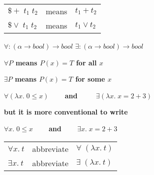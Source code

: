 \vskip7mm


\vskip7mm
\bspindent\LARGE{\bf
\begin{tabular}{@{}l@{\qquad}l@{\qquad}l}
\( \$+ \; t_1 \; t_2 \) & means & \( t_1 + t_2 \) \\
\( \$\vee \; t_1 \; t_2\) & means & \( t_1 \vee t_2 \) \\
\end{tabular}}
\espindent



\vskip 7mm
\bspindent\LARGE 
\( \forall : (\alpha \rightarrow bool) \rightarrow bool \)
\espindent
\vskip 5mm
\bspindent\LARGE 
\( \exists : (\alpha \rightarrow bool) \rightarrow bool \)
\espindent

\vskip5mm


\vskip 7mm
\bspindent\LARGE 
{\bf $\forall P$ means $P(x)=T$ for all $x$}
\espindent

\vskip 7mm
\bspindent\LARGE 
{\bf $\exists P$ means $P(x)=T$ for some $x$}
\espindent



\vskip 5mm
\bspindent\LARGE\bf\(\forall(\lambda x. \; 0 \leq x)\)~~~~and~~~~
\(\exists(\lambda x. \; x = 2+3) \)
\espindent

\vskip 5mm

\bpindent\LARGE{\bf but it is more conventional to write}
\epindent

\vskip 5mm
\bspindent\LARGE{\bf
\(\forall x. \; 0 \leq x\)~~~~and~~~~\(\exists x. \; x = 2+3\)}
\espindent

\vskip7mm


\vskip5mm

\bspindent\LARGE{\bf
\begin{tabular}{@{}l@{\qquad}l@{\qquad}l}
\(\forall x.\:t \) & abbreviate & \( \forall\;(\lambda x.\:t)\)\\
\(\exists x.\:t \) & abbreviate & \( \exists\;(\lambda x.\:t)\)
\end{tabular}}
\espindent


